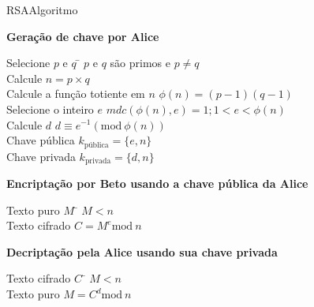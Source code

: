 \begin{frame}{RSA}{Algoritmo}\footnotesize

  \hfil {\color{blue}\bf Geração de chave por Alice}
  
\begin{tabbing}
  Selecione $p$ e $q$ \hspace{3.3cm}\= $p$ e $q$ são primos e $p\neq q$\\
  Calcule $n=p\times q$\\
  Calcule a função totiente em $n$\> $\phi(n) = (p-1)(q-1)$\\
   Selecione o inteiro $e$ \> $mdc(\phi(n),e)=1; 1<e<\phi(n)$\\
   Calcule $d$ \> $d\equiv e^{-1}(\text{mod}\ \phi(n))$\\
   Chave pública \> $k_{\text{pública}}=\{e,n\}$\\
   Chave privada \> $k_{\text{privada}}=\{d,n\}$\\
\end{tabbing}

\pause

\hfil {\color{blue}\bf Encriptação por Beto usando a chave pública da Alice}
\begin{tabbing}
  Texto puro $M$ \hspace{3.3cm}\= $M<n$\\
  Texto cifrado \> $C = M^e \text{mod}\ n$\\
\end{tabbing}

\pause

\hfil {\color{blue}\bf Decriptação pela Alice usando sua chave privada}
\begin{tabbing}
  Texto cifrado $C$ \hspace{3.3cm}\= $M<n$\\
  Texto puro \> $M = C^d \text{mod}\ n$\\
\end{tabbing}

\end{frame}

